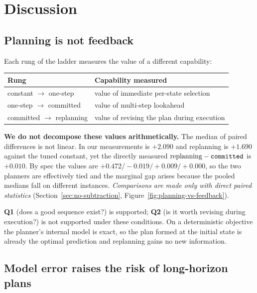 \section{Discussion}
\label{sec:discussion}

\subsection{Planning is not feedback}
\label{sec:planning-not-feedback}

Each rung of the ladder measures the value of a different capability:

\begin{center}
\begin{tabular}{ll}
\toprule
Rung & Capability measured \\
\midrule
constant $\rightarrow$ one-step   & value of immediate per-state selection \\
one-step $\rightarrow$ committed  & value of multi-step lookahead \\
committed $\rightarrow$ replanning & value of revising the plan during execution \\
\bottomrule
\end{tabular}
\end{center}

\textbf{We do not decompose these values arithmetically.} The median of paired
differences is not linear. In our measurements  is $+2.090$ and
replanning is $+1.690$ against the tuned constant, yet the directly measured
$\text{replanning} - \texttt{committed}$ is $+0.010$. By spec the values are
$+0.472 / -0.019 / +0.009 / +0.000$, so the two planners are effectively tied and
the marginal gap arises because the pooled medians fall on different instances.
\emph{Comparisons are made only with direct paired statistics}
(Section~\ref{sec:no-subtraction}, Figure~\ref{fig:planning-vs-feedback}).

\textbf{Q1} (does a good sequence exist?) is supported; \textbf{Q2} (is it worth
revising during execution?) is not supported under these conditions. On a
deterministic objective the planner's internal model is exact, so the plan formed at
the initial state is already the optimal prediction and replanning gains no new
information.

\subsection{Model error raises the risk of long-horizon plans}
\label{sec:model-error}

